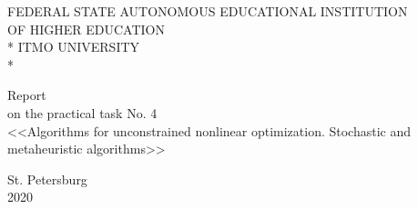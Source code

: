 \newpage
\begin{titlepage}

\begin{center}\large{
    FEDERAL STATE AUTONOMOUS EDUCATIONAL INSTITUTION \\
    OF HIGHER EDUCATION \\*
    ITMO UNIVERSITY \\*
}\end{center}

\vspace{12em}

\begin{center}\large{
    Report \\
    on the practical task No. 4 \\
    <<Algorithms for unconstrained nonlinear optimization.
    Stochastic and metaheuristic algorithms>>
}\end{center}

\vspace{8.5em}

\vspace{1.5em}

\vspace{\fill}

\begin{center}
    St. Petersburg \\
    2020
\end{center}

\end{titlepage}

